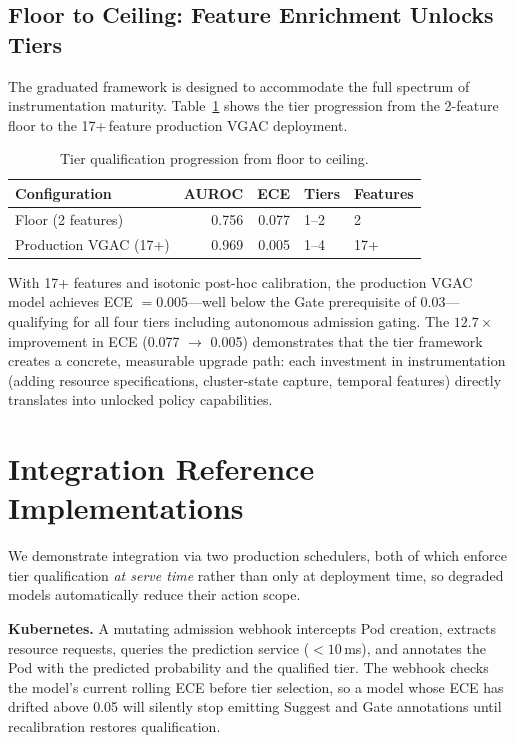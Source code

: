 \documentclass[sigconf]{acmart}
\begin{document}
\subsection{Floor to Ceiling: Feature Enrichment Unlocks Tiers}
The graduated framework is designed to accommodate the full spectrum of instrumentation maturity. Table~\ref{tab:ceiling} shows the tier progression from the 2-feature floor to the 17+\,feature production VGAC deployment.

\begin{table}[t]
\centering
\caption{Tier qualification progression from floor to ceiling.}
\label{tab:ceiling}
\small
\begin{tabular}{@{}lrrll@{}}
\toprule
\textbf{Configuration}      & \textbf{AUROC} & \textbf{ECE}   & \textbf{Tiers} & \textbf{Features} \\
\midrule
Floor (2 features)          & 0.756          & 0.077          & 1--2           & 2     \\
Production VGAC (17+)       & 0.969          & 0.005          & 1--4           & 17+   \\
\bottomrule
\end{tabular}
\end{table}

With 17+ features and isotonic post-hoc calibration, the production VGAC model achieves ECE $=0.005$---well below the Gate prerequisite of 0.03---qualifying for all four tiers including autonomous admission gating. The $12.7\times$ improvement in ECE (0.077 $\to$ 0.005) demonstrates that the tier framework creates a concrete, measurable upgrade path: each investment in instrumentation (adding resource specifications, cluster-state capture, temporal features) directly translates into unlocked policy capabilities.

\section{Integration Reference Implementations}
\label{sec:integration}
We demonstrate integration via two production schedulers, both of which enforce tier qualification \emph{at serve time} rather than only at deployment time, so degraded models automatically reduce their action scope.

\textbf{Kubernetes.} A mutating admission webhook intercepts Pod creation, extracts resource requests, queries the prediction service ($<10$\,ms), and annotates the Pod with the predicted probability and the qualified tier. The webhook checks the model's current rolling ECE before tier selection, so a model whose ECE has drifted above 0.05 will silently stop emitting Suggest and Gate annotations until recalibration restores qualification.
\end{document}
